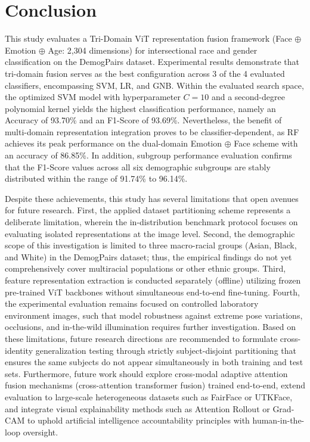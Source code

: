 \section{Conclusion}
\label{sec:conclusion}

This study evaluates a Tri-Domain ViT representation fusion framework (Face $\oplus$ Emotion $\oplus$ Age: 2,304 dimensions) for intersectional race and gender classification on the DemogPairs dataset. Experimental results demonstrate that tri-domain fusion serves as the best configuration across 3 of the 4 evaluated classifiers, encompassing SVM, LR, and GNB. Within the evaluated search space, the optimized SVM model with hyperparameter $C=10$ and a second-degree polynomial kernel yields the highest classification performance, namely an Accuracy of 93.70\% and an F1-Score of 93.69\%. Nevertheless, the benefit of multi-domain representation integration proves to be classifier-dependent, as RF achieves its peak performance on the dual-domain Emotion $\oplus$ Face scheme with an accuracy of 86.85\%. In addition, subgroup performance evaluation confirms that the F1-Score values across all six demographic subgroups are stably distributed within the range of 91.74\% to 96.14\%.

Despite these achievements, this study has several limitations that open avenues for future research. First, the applied dataset partitioning scheme represents a deliberate limitation, wherein the in-distribution benchmark protocol focuses on evaluating isolated representations at the image level. Second, the demographic scope of this investigation is limited to three macro-racial groups (Asian, Black, and White) in the DemogPairs dataset; thus, the empirical findings do not yet comprehensively cover multiracial populations or other ethnic groups. Third, feature representation extraction is conducted separately (offline) utilizing frozen pre-trained ViT backbones without simultaneous end-to-end fine-tuning. Fourth, the experimental evaluation remains focused on controlled laboratory environment images, such that model robustness against extreme pose variations, occlusions, and in-the-wild illumination requires further investigation. Based on these limitations, future research directions are recommended to formulate cross-identity generalization testing through strictly subject-disjoint partitioning that ensures the same subjects do not appear simultaneously in both training and test sets. Furthermore, future work should explore cross-modal adaptive attention fusion mechanisms (cross-attention transformer fusion) trained end-to-end, extend evaluation to large-scale heterogeneous datasets such as FairFace or UTKFace, and integrate visual explainability methods such as Attention Rollout or Grad-CAM to uphold artificial intelligence accountability principles with human-in-the-loop oversight.

